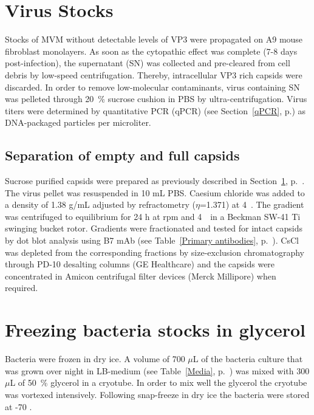 
\section{Virus Stocks}
\label{Virus Stocks}
Stocks of MVM without detectable levels of VP3 were propagated on A9 mouse fibroblast monolayers. As soon as the cytopathic effect was complete (7-8 days post-infection), the supernatant (SN) was collected and pre-cleared from cell debris by low-speed centrifugation. Thereby, intracellular VP3 rich capsids were discarded. In order to remove low-molecular contaminants, virus containing SN was pelleted through 20~\% sucrose cushion in PBS by ultra-centrifugation. Virus titers were determined by quantitative PCR (qPCR) (see Section~\ref{qPCR}, p.\pageref{qPCR}) as DNA-packaged particles per microliter.   


\subsection{Separation of empty and full capsids}

Sucrose purified capsids were prepared as previously described in Section~\ref{Virus Stocks}, p.~\pageref{Virus Stocks}. The virus pellet was resuspended in 10 mL PBS. Caesium chloride was added to a density of 1.38 g/mL adjusted by refractometry ($\eta$=1.371) at 4~\textcelsius. The gradient was centrifuged to equilibrium for 24 h at  rpm and 4~\textcelsius~in a Beckman SW-41 Ti swinging bucket rotor. Gradients were fractionated and tested for intact capsids by dot blot analysis using B7 mAb (see Table~\ref{Primary antibodies}, p.~\pageref{Primary antibodies}). CsCl was depleted from the corresponding fractions by size-exclusion chromatography through PD-10 desalting columns (GE Healthcare) and the capsids were concentrated in Amicon\textsuperscript{\textregistered} centrifugal filter devices (Merck Millipore) when required.          
   
   


\section{Freezing bacteria stocks in glycerol}
Bacteria were frozen in dry ice. A volume of 700 $\mu$L of the bacteria culture that was grown over night in LB-medium (see Table~\ref{Media}, p.~\pageref{Media}) was mixed with 300 $\mu$L of 50~\% glycerol in a cryotube. In order to mix well the glycerol the cryotube was vortexed intensively. Following snap-freeze in dry ice the bacteria were stored at -70 \textcelsius.


